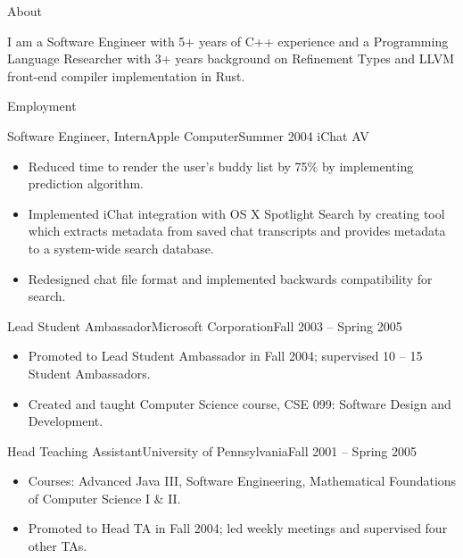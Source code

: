 \documentclass[calibri]{mcdowellcv}
\begin{document}
	\makeheader{}

	\begin{cvsection}{About}
		\begin{cvsubsection}{}{}{}
		I am a Software Engineer with 5+ years of C++ experience and a Programming Language Researcher with 3+ years background on Refinement Types and LLVM front-end compiler implementation in Rust.
		\end{cvsubsection}
	\end{cvsection}

	\begin{cvsection}{Employment}
		\begin{cvsubsection}{Software Engineer, Intern}{Apple Computer}{Summer 2004}
			iChat AV
			\begin{itemize}
				\item Reduced time to render the user's buddy list by 75\% by implementing prediction algorithm.
				\item Implemented iChat integration with OS X Spotlight Search by creating tool which extracts metadata from saved chat transcripts and provides metadata to a system-wide search database.
				\item Redesigned chat file format and implemented backwards compatibility for search.
			\end{itemize}
		\end{cvsubsection}

		\begin{cvsubsection}{Lead Student Ambassador}{Microsoft Corporation}{Fall 2003 -- Spring 2005}
			\begin{itemize}
				\item Promoted to Lead Student Ambassador in Fall 2004; supervised 10 -- 15 Student Ambassadors.
				\item Created and taught Computer Science course, CSE 099: Software Design and Development.
			\end{itemize}
		\end{cvsubsection}

		\begin{cvsubsection}{Head Teaching Assistant}{University of Pennsylvania}{Fall 2001 -- Spring 2005}
			\begin{itemize}
				\item Courses: Advanced Java III, Software Engineering, Mathematical Foundations of Computer Science I \& II.
				\item Promoted to Head TA in Fall 2004; led weekly meetings and supervised four other TAs.
			\end{itemize}
		\end{cvsubsection}


\end{cvsection}
\end{document}
